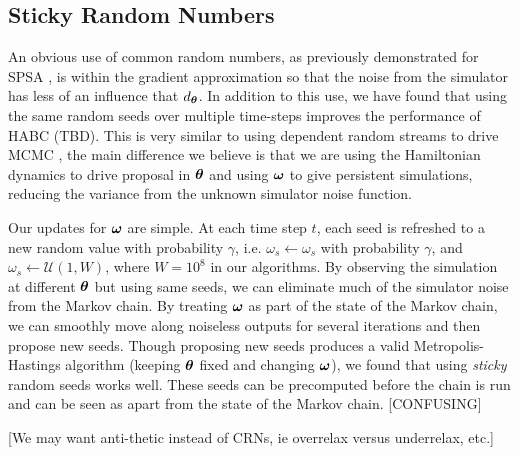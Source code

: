 \documentclass[]{article}
\begin{document}
\subsection{Sticky Random Numbers}
An obvious use of common random numbers, as previously demonstrated for SPSA \cite{kleinman1999simulation}, is within the gradient approximation so that the noise from the simulator has less of an influence that $d_{{\bm \theta}}$.  In addition to this use, we have found that using the same random seeds over multiple time-steps improves the performance of HABC (TBD).  This is very similar to using dependent random streams to drive MCMC \cite{Murray2012,Neal2012}, the main difference we believe is that we are using the Hamiltonian dynamics to drive proposal in ${\bm \theta}$ and using ${\bm \omega}$ to give persistent simulations, reducing the variance from the unknown simulator noise function.

Our updates for ${\bm \omega}$ are simple.  At each time step $t$, each seed is refreshed to a new random value with probability $\gamma$, i.e. $\omega_s \leftarrow \omega_s$ with probability $\gamma$, and $\omega_s \leftarrow \mathcal{U}(1,W)$, where $W=10^8$ in our algorithms.  By observing the simulation at different ${\bm \theta}$ but using same seeds, we can eliminate much of the simulator noise from the Markov chain.  By treating ${\bm \omega}$ as part of the state of the Markov chain, we can smoothly move along noiseless outputs for several iterations and then propose new seeds.  Though proposing new seeds produces a valid Metropolis-Hastings algorithm (keeping ${\bm \theta}$ fixed and changing ${\bm \omega}$), we found that using {\em sticky} random seeds works well.  These seeds can be precomputed before the chain is run and can be seen as apart from the state of the Markov chain.  [CONFUSING]

[We may want anti-thetic instead of CRNs, ie overrelax versus underrelax, etc.]
%
%
\end{document}
